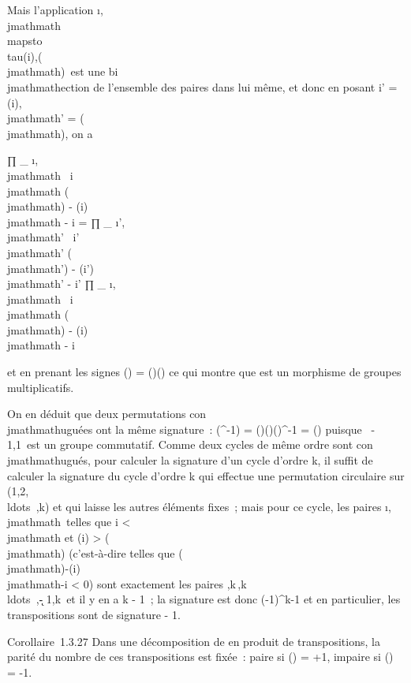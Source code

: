 Mais l'application
\i,\\jmathmath\\mapsto~\\tau(i),\tau(\\jmathmath)\
est une bi\\jmathmathection de l'ensemble des paires dans lui même, et donc en
posant i' = \tau(i),\\jmathmath' = \tau(\\jmathmath), on a

∏ _
\i,\\jmathmath\ \atop
i\neq~\\jmathmath  \sigma\tau(\\jmathmath) - \sigma\tau(i) \over
\\jmathmath - i = ∏ _
\i',\\jmathmath'\ \atop
i'\neq~\\jmathmath'  \sigma(\\jmathmath') - \sigma(i')
\over \\jmathmath' - i' ∏ _
\i,\\jmathmath\ \atop
i\neq~\\jmathmath  \tau(\\jmathmath) - \tau(i) \over \\jmathmath
- i

et en prenant les signes \epsilon(\sigma\tau) = \epsilon(\sigma)\epsilon(\tau) ce qui montre que \sigma est un
morphisme de groupes multiplicatifs.

On en déduit que deux permutations con\\jmathmathuguées ont la même signature~:
\epsilon(\tau\sigma\tau^-1) = \epsilon(\tau)\epsilon(\sigma)\epsilon(\tau)^-1 = \epsilon(\sigma) puisque
\ - 1,1\ est un groupe commutatif.
Comme deux cycles de même ordre sont con\\jmathmathugués, pour calculer la
signature d'un cycle d'ordre k, il suffit de calculer la signature du
cycle \sigma d'ordre k qui effectue une permutation circulaire sur
(1,2,\\ldots~,k) et
qui laisse les autres éléments fixes~; mais pour ce cycle, les paires
\i,\\jmathmath\ telles que i \textless{} \\jmathmath et
\sigma(i) \textgreater{} \sigma(\\jmathmath) (c'est-à-dire telles que  \sigma(\\jmathmath)-\sigma(i)
\over \\jmathmath-i \textless{} 0) sont exactement les paires
\1,k\,\2,k\,\\ldots~,\k
- 1,k\ et il y en a k - 1~; la signature est donc
(-1)^k-1 et en particulier, les transpositions sont de
signature - 1.

Corollaire~1.3.27 Dans une décomposition de \sigma en produit de
transpositions, la parité du nombre de ces transpositions est fixée~:
paire si \epsilon(\sigma) = +1, impaire si \epsilon(\sigma) = -1.
